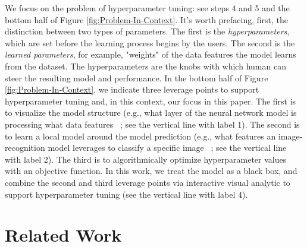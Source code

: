 \documentclass[preprint]{vgtc}        %
\newcommand{\skye}[1]{{ #1}}
\newcommand{\gregorio}[1]{{ #1}}
\begin{document}
We focus on the problem of hyperparameter tuning: see steps 4 and 5 and the bottom half of Figure \ref{fig:Problem-In-Context}. 
It's worth prefacing, first, the distinction between two types of parameters. The first is the \textit{hyperparameters}, which are set before the learning process begins by the users. The second is the \textit{learned parameters}, for example, "weights" of the data features the model learns from the dataset. The hyperparameters are the knobs with which human can steer the resulting model and performance.
\gregorio{In the bottom half of Figure \ref{fig:Problem-In-Context}}, we indicate three leverage points to support hyperparameter tuning and, in this context, our focus in this paper.
The first is to visualize the model structure (e.g., what layer of the neural network model is processing what data features ~\cite{Liu2017TowardsPerspective}; see the vertical line with label 1). The second is to learn a local model around the model prediction (e.g., what features an image-recognition model leverages to classify a specific image ~\cite{Ribeiro2016quotWhyYouquot}; see the vertical line with label 2). The third is to algorithmically optimize hyperparameter values with an objective function.
\skye{In this work, we treat the model as a black box, and combine the second and third leverage points via interactive visual analytic to support hyperparameter tuning (see the vertical line with label 4).}

\section{Related Work}
\end{document}
